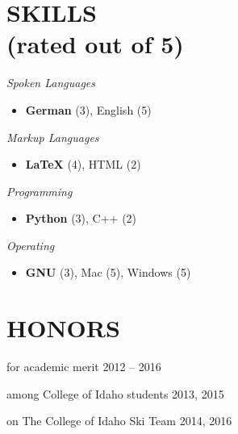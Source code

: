 \documentclass[margin]{res}
\newcommand\cs[1]{\textsl{#1} } \newcommand\ri[1]{\textsl{#1} }
\newenvironment{details}{\begin{itemize}[itemsep=0.6pt,topsep=2.3pt] }{\end{itemize} }
\begin{document}
\begin{resume}
\section{SKILLS\\(rated out of 5)}
\vspace{0pt}
\begin{multicols}{2}
	\parskip=0pt
    \cs{Spoken Languages}
    		\begin{details}
            	\item \textbf{German} (3), English (5)
        	\end{details}
    \cs{Markup Languages} 
        	\begin{details}
            	\item \textbf{\LaTeX} (4), HTML (2)
            \end{details}
    \cs{Programming}
        	\begin{details}
            	\item \textbf{Python} (3), C++ (2)
            \end{details}
    \cs{Operating}
        	\begin{details}
            	\item \textbf{GNU} (3), Mac (5), Windows (5)
            \end{details}    
\end{multicols}

\section{HONORS}
\vspace{10pt}
	\begin{description}[noitemsep,topsep=0pt]
		\item[Heritage Scholarship] for academic merit \hfill 2012 -- 2016
    	\item[Top Putnam Score] among College of Idaho students \hfill 2013, 2015
        \item[Varsity Skier] on The College of Idaho Ski Team \hfill 2014, 2016
	\end{description}

\end{resume}
\end{document}
